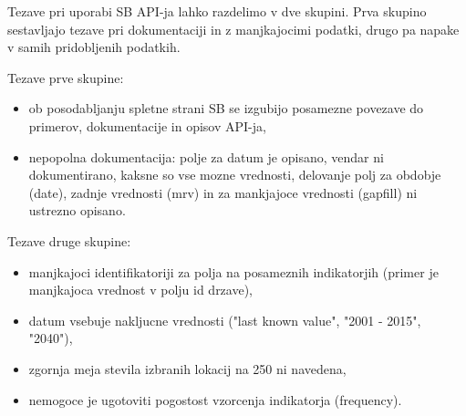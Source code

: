 Tezave pri uporabi SB API-ja lahko razdelimo v dve skupini. Prva skupino
sestavljajo tezave pri dokumentaciji in z manjkajocimi podatki, drugo pa
napake v samih pridobljenih podatkih.

Tezave prve skupine:

\begin{itemize}  
\item ob posodabljanju spletne strani SB se izgubijo posamezne povezave do 
  primerov, dokumentacije in opisov API-ja,
\item nepopolna dokumentacija:
\subitem polje za datum je opisano, vendar ni dokumentirano, kaksne so vse mozne 
    vrednosti,
\subitem delovanje polj za obdobje (date), zadnje vrednosti (mrv) in za mankjajoce
    vrednosti (gapfill) ni ustrezno opisano.
\end{itemize}  

Tezave druge skupine:


\begin{itemize}  
\item manjkajoci identifikatoriji za polja na posameznih indikatorjih (primer je
  manjkajoca vrednost v polju id drzave),
\item datum vsebuje nakljucne vrednosti ("last known value", "2001 - 2015", "2040"),
\item zgornja meja stevila izbranih lokacij na 250 ni navedena,
\item nemogoce je ugotoviti pogostost vzorcenja indikatorja (frequency).
\end{itemize}  







